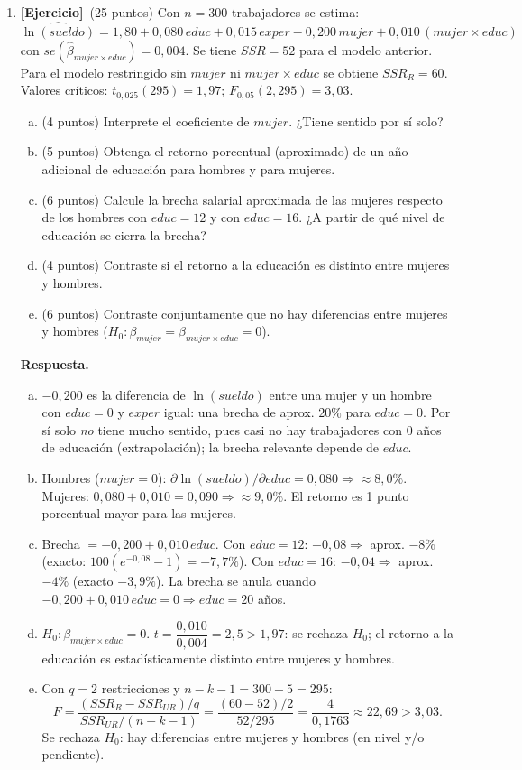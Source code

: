 \documentclass[12pt,letterpaper]{article}
\newenvironment{resp}{\begingroup\color{blue}\par\noindent\textbf{Respuesta.}\ }{\par\endgroup}
\newcommand{\ejer}{\textbf{[Ejercicio]}}
\begin{document}
\begin{enumerate}[1.]
\item \ejer\ (25 puntos) Con $n=300$ trabajadores se estima:
\[
\widehat{\ln(sueldo)}=1{,}80+0{,}080\,educ+0{,}015\,exper-0{,}200\,mujer+0{,}010\,(mujer\times educ)
\]
con $se(\hat\beta_{mujer\times educ})=0{,}004$. Se tiene $SSR=52$ para el modelo anterior. Para el modelo restringido sin $mujer$ ni $mujer\times educ$ se obtiene $SSR_R=60$. Valores críticos: $t_{0{,}025}(295)=1{,}97$; $F_{0{,}05}(2,295)=3{,}03$.
\begin{enumerate}[a)]
\item (4 puntos) Interprete el coeficiente de $mujer$. ¿Tiene sentido por sí solo?
\item (5 puntos) Obtenga el retorno porcentual (aproximado) de un año adicional de educación para hombres y para mujeres.
\item (6 puntos) Calcule la brecha salarial aproximada de las mujeres respecto de los hombres con $educ=12$ y con $educ=16$. ¿A partir de qué nivel de educación se cierra la brecha?
\item (4 puntos) Contraste si el retorno a la educación es distinto entre mujeres y hombres.
\item (6 puntos) Contraste conjuntamente que no hay diferencias entre mujeres y hombres ($H_0:\beta_{mujer}=\beta_{mujer\times educ}=0$).
\end{enumerate}

\begin{resp}
\begin{enumerate}[a)]
\item $-0{,}200$ es la diferencia de $\ln(sueldo)$ entre una mujer y un hombre con $educ=0$ y $exper$ igual: una brecha de aprox. $20\%$ para $educ=0$. Por sí solo \emph{no} tiene mucho sentido, pues casi no hay trabajadores con 0 años de educación (extrapolación); la brecha relevante depende de $educ$.
\item Hombres ($mujer=0$): $\partial\ln(sueldo)/\partial educ=0{,}080\Rightarrow\approx8{,}0\%$. Mujeres: $0{,}080+0{,}010=0{,}090\Rightarrow\approx9{,}0\%$. El retorno es 1 punto porcentual mayor para las mujeres.
\item Brecha $=-0{,}200+0{,}010\,educ$. Con $educ=12$: $-0{,}08\Rightarrow$ aprox. $-8\%$ (exacto: $100(e^{-0{,}08}-1)=-7{,}7\%$). Con $educ=16$: $-0{,}04\Rightarrow$ aprox. $-4\%$ (exacto $-3{,}9\%$). La brecha se anula cuando $-0{,}200+0{,}010\,educ=0\Rightarrow educ=20$ años.
\item $H_0:\beta_{mujer\times educ}=0$. $t=\dfrac{0{,}010}{0{,}004}=2{,}5>1{,}97$: se rechaza $H_0$; el retorno a la educación es estadísticamente distinto entre mujeres y hombres.
\item Con $q=2$ restricciones y $n-k-1=300-5=295$:
\[
F=\frac{(SSR_R-SSR_{UR})/q}{SSR_{UR}/(n-k-1)}=\frac{(60-52)/2}{52/295}=\frac{4}{0{,}1763}\approx22{,}69>3{,}03 .
\]
Se rechaza $H_0$: hay diferencias entre mujeres y hombres (en nivel y/o pendiente).
\end{enumerate}
\end{resp}
\end{enumerate}
\end{document}
